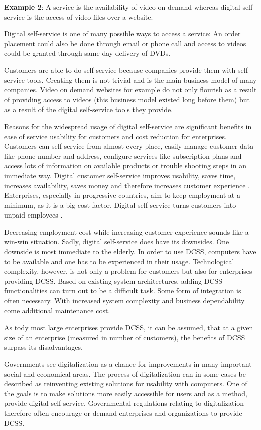\documentclass[
     12pt,         %
     a4paper,      %
     BCOR10mm,     %
     DIV14,        %
aragraph skip instad of paragraph indent
     ]{scrreprt}
\begin{document}
\textbf{Example 2}: A service is the availability of video on demand whereas digital self-service is the access of video files over a website.

Digital self-service is one of many possible ways to access a service: An order placement could also be done through email
or phone call and access to videos could be granted through same-day-delivery of DVDs.

Customers are able to do self-service because companies provide them with self-service tools. Creating them is not trivial
and is the main business model of many companies. Video on demand websites for example do not only flourish as a result of providing access to
videos (this business model existed long before them) but as a result of the digital self-service tools they provide.

Reasons for the widespread usage of digital self-service are significant benefits in ease of service usability for customers and cost reduction for enterprises.
Customers can self-service from almost every place, easily manage customer data like phone number and address, configure services like subscription plans and
access lots of information on available products or trouble shooting steps in an immediate way.
Digital customer self-service improves usability, saves time, increases availability, saves money and therefore increases customer experience
\cite[cf. 243]{CSSInternetAge}.
Enterprises, especially in progressive countries, aim to keep employment at a minimum, as it is a big cost factor. Digital self-service turns customers into
unpaid employees \cite{served}.

Decreasing employment cost while increasing customer experience sounds like a win-win situation. Sadly, digital self-service does have its downsides.
One downside is most immediate to the elderly. In order to use DCSS, computers have to be available and one has to be experienced in their usage.
Technological complexity, however, is not only a problem for customers but also for enterprises providing DCSS. Based on existing system architectures,
adding DCSS functionalities can turn out to be a difficult task. Some form of integration is often necessary. With increased system complexity and business
dependability come additional maintenance cost.

As tody most large enterprises provide DCSS, it can be assumed, that at a given size of an enterprise (measured in number of customers), the benefits of DCSS
surpass its disadvantages.

Governments see digitalization as a chance for improvements in many important social and economical areas. The process of digitalization can in
some cases be described as reinventing existing solutions for usability with computers. One of the goals is to make solutions more easily accessible for users and as a 
method, provide digital self-service. Governmental regulations relating to digitalization therefore often encourage or demand enterprises and organizations to 
provide DCSS.
\end{document}
